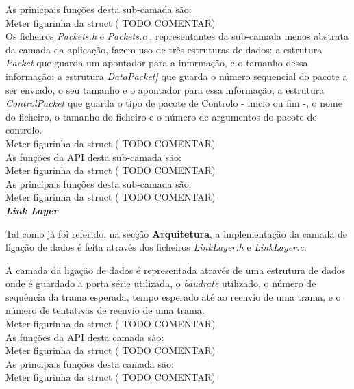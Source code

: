 \documentclass[a4paper]{article}
\begin{document}
As prinicpais funções desta sub-camada são:\\
Meter figurinha da struct ( TODO COMENTAR)\\

Os ficheiros \textit{Packets.h} e \textit{Packets.c} , representantes da sub-camada menos abstrata da camada da aplicação, fazem uso de três estruturas de dados: a estrutura \textit{Packet} que guarda um apontador para a informação, e o tamanho dessa informação; a estrutura \textit{DataPacket]} que guarda o número sequencial do pacote a ser enviado, o seu tamanho e o apontador para essa informação; a estrutura \textit{ControlPacket} que guarda o tipo de pacote de Controlo - inicio ou fim -, o nome do ficheiro, o tamanho do ficheiro e o número de argumentos do pacote de controlo.\\
Meter figurinha da struct ( TODO COMENTAR)\\

As funções da API desta sub-camada são:\\
Meter figurinha da struct ( TODO COMENTAR)\\

As principais funções desta sub-camada são:\\
Meter figurinha da struct ( TODO COMENTAR)\\

\large\textbf{\textit{Link Layer}}\\
\normalsize

Tal como já foi referido, na secção \textbf{Arquitetura}, a implementação da camada de ligação de dados é feita através dos ficheiros \textit{LinkLayer.h} e \textit{LinkLayer.c}.

A camada da ligação de dados é representada através de uma estrutura de dados onde é guardado a porta série utilizada, o \textit{baudrate} utilizado, o número de sequência da trama esperada, tempo esperado até ao reenvio de uma trama, e o número de tentativas de reenvio de uma trama.\\
Meter figurinha da struct ( TODO COMENTAR)\\

As funções da API desta camada são:\\
Meter figurinha da struct ( TODO COMENTAR)\\

As principais funções desta camada são:\\
Meter figurinha da struct ( TODO COMENTAR)\\
\end{document}
